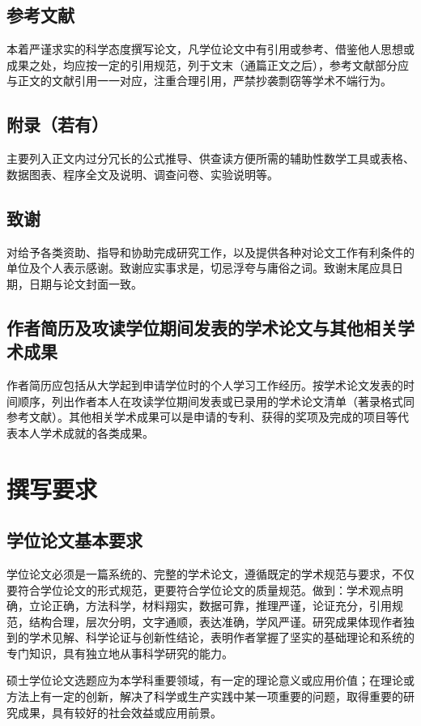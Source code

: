 {\subsection{参考文献}
本着严谨求实的科学态度撰写论文，凡学位论文中有引用或参考、借鉴他人思想或成果之处，均应按一定的引用规范，列于文末（通篇正文之后），参考文献部分应与正文的文献引用一一对应，注重合理引用，严禁抄袭剽窃等学术不端行为。
\subsection{附录（若有）}
主要列入正文内过分冗长的公式推导、供查读方便所需的辅助性数学工具或表格、数据图表、程序全文及说明、调查问卷、实验说明等。
\subsection{致谢}
对给予各类资助、指导和协助完成研究工作，以及提供各种对论文工作有利条件的单位及个人表示感谢。致谢应实事求是，切忌浮夸与庸俗之词。致谢末尾应具日期，日期与论文封面一致。
\subsection{作者简历及攻读学位期间发表的学术论文与其他相关学术成果}
作者简历应包括从大学起到申请学位时的个人学习工作经历。按学术论文发表的时间顺序，列出作者本人在攻读学位期间发表或已录用的学术论文清单（著录格式同参考文献）。其他相关学术成果可以是申请的专利、获得的奖项及完成的项目等代表本人学术成就的各类成果。


\section{撰写要求}

\subsection{学位论文基本要求}
学位论文必须是一篇系统的、完整的学术论文，遵循既定的学术规范与要求，不仅要符合学位论文的形式规范，更要符合学位论文的质量规范。做到：学术观点明确，立论正确，方法科学，材料翔实，数据可靠，推理严谨，论证充分，引用规范，结构合理，层次分明，文字通顺，表达准确，学风严谨。研究成果体现作者独到的学术见解、科学论证与创新性结论，表明作者掌握了坚实的基础理论和系统的专门知识，具有独立地从事科学研究的能力。

硕士学位论文选题应为本学科重要领域，有一定的理论意义或应用价值；在理论或方法上有一定的创新，解决了科学或生产实践中某一项重要的问题，取得重要的研究成果，具有较好的社会效益或应用前景。

}
